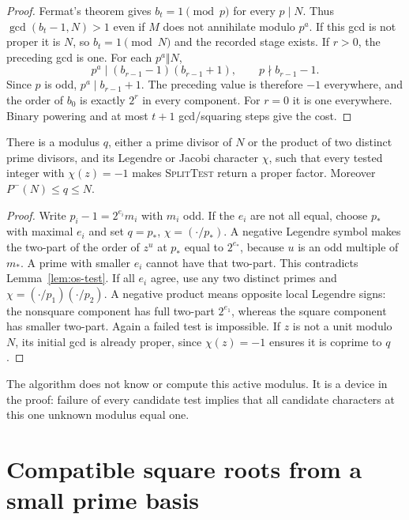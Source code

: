 \begin{proof}
Fermat's theorem gives $b_t=1\pmod p$ for every $p\mid N$.
Thus $\gcd(b_t-1,N)>1$ even if $M$ does not annihilate modulo $p^a$.
If this gcd is not proper it is $N$, so $b_t=1\pmod N$ and the recorded
stage exists.  If $r>0$, the preceding gcd is one.  For each $p^a\Vert N$,
\[
 p^a\mid(b_{r-1}-1)(b_{r-1}+1),\qquad p\nmid b_{r-1}-1.
\]
Since $p$ is odd, $p^a\mid b_{r-1}+1$.  The preceding value is therefore
$-1$ everywhere, and the order of $b_0$ is exactly $2^r$ in every
component.  For $r=0$ it is one everywhere.
Binary powering and at most $t+1$ gcd/squaring steps give the cost.
\end{proof}

\begin{lemma}
\label{lem:os-active}
There is a modulus $q$, either a prime divisor of $N$ or the product of
two distinct prime divisors, and its Legendre or Jacobi character $\chi$,
such that every tested integer with $\chi(z)=-1$ makes
\textsc{SplitTest} return a proper factor.  Moreover
$P^-(N)\leq q\leq N$.
\end{lemma}

\begin{proof}
Write $p_i-1=2^{e_i}m_i$ with $m_i$ odd.
If the $e_i$ are not all equal, choose $p_*$ with maximal $e_i$ and set
$q=p_*$, $\chi=(\cdot/p_*)$.  A negative Legendre symbol makes the
two-part of the order of $z^u$ at $p_*$ equal to $2^{e_*}$, because
$u$ is an odd multiple of $m_*$.  A prime with smaller $e_i$ cannot
have that two-part.  This contradicts Lemma~\ref{lem:os-test}.
If all $e_i$ agree, use any two distinct primes and
$\chi=(\cdot/p_1)(\cdot/p_2)$.  A negative product means opposite local
Legendre signs: the nonsquare component has full two-part $2^{e_1}$,
whereas the square component has smaller two-part.  Again a failed test
is impossible.  If $z$ is not a unit modulo $N$, its initial gcd is
already proper, since $\chi(z)=-1$ ensures it is coprime to $q$.
\end{proof}

The algorithm does not know or compute this active modulus.  It is a
device in the proof: failure of every candidate test implies that all
candidate characters at this one unknown modulus equal one.

\section{Compatible square roots from a small prime basis}
\label{sec:os-roots}

